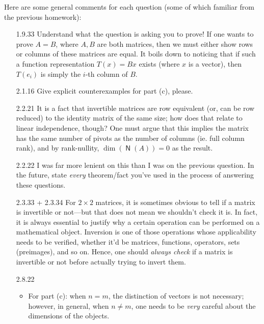 \documentclass{amsart}
\theoremstyle{definition}
\theoremstyle{definition}
\DeclareMathOperator{\1}{\mathbbm{1}}
\DeclareMathOperator{\nul}{\mathsf{N}}
\begin{document}
Here are some general comments for each question (some of which familiar from the previous homework):

\begin{enumerate}
	\item[1.9.33] Understand what the question is asking you to prove! If one wants to prove $A = B$, where $A,B$ are both matrices, then we must either show rows or columns of these matrices are equal. It boils down to noticing that if such a function representation $T(x) = Bx$ exists (where $x$ is a vector), then $T(e_i)$ is simply the $i$-th column of $B$.
	
	
	
	\item[2.1.16] Give explicit counterexamples for part (c), please.
	
	
	
	\item[2.2.21] It is a fact that invertible matrices are row equivalent (or, can be row reduced) to the identity matrix of the same size; how does that relate to linear independence, though? One must argue that this implies the matrix has the same number of pivots as the number of columns (ie. full column rank), and by rank-nullity, $\dim(\nul(A)) = 0$ as the result.
	
	
	
	\item[2.2.22] I was far more lenient on this than I was on the previous question. In the future, state \textit{every} theorem/fact you've used in the process of answering these questions.
	
	
	\item[2.3.33 + 2.3.34] For $2 \times 2$ matrices, it is sometimes obvious to tell if a matrix is invertible or not---but that does not mean we shouldn't check it is. In fact, it is always essential to justify why a certain operation can be performed on a mathematical object. Inversion is one of those operations whose applicability needs to be verified, whether it'd be matrices, functions, operators, sets (preimages), and so on. Hence, one should \textit{always check} if a matrix is invertible or not before actually trying to invert them.
	
	
	
	\item[2.8.22] \begin{itemize}
		\item For part (c): when $n = m$, the distinction of vectors is not necessary; however, in general, when $n \neq m$, one needs to be \textit{very} careful about the dimensions of the objects.
		

\end{itemize}
\end{enumerate}
\end{document}
